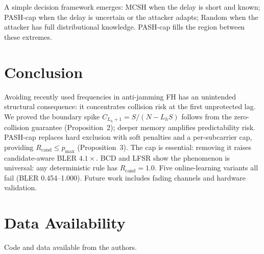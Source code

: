 \documentclass[letterpaper,journal,10pt]{IEEEtran}
\begin{document}
A simple decision framework emerges: MCSH when the delay is short and
known; PASH-cap when the delay is uncertain or the attacker adapts; Random
when the attacker has full distributional knowledge. PASH-cap fills the
region between these extremes.

\balance
\section{Conclusion}
Avoiding recently used frequencies in anti-jamming FH has an unintended
structural consequence: it concentrates collision risk at the first
unprotected lag. We proved the boundary spike $C_{L_h+1}=S/(N-L_hS)$
follows from the zero-collision guarantee (Proposition~2); deeper memory
amplifies predictability risk. PASH-cap replaces hard exclusion with soft
penalties and a per-subcarrier cap, providing $R_{\mathrm{cand}}{\leq}p_{\max}$
(Proposition~3). The cap is essential: removing it raises candidate-aware
BLER $4.1\times$. BCD and LFSR show the phenomenon is universal: any
deterministic rule has $R_{\mathrm{cand}}{=}1.0$. Five online-learning
variants all fail (BLER 0.454--1.000). Future work includes fading channels
and hardware validation.

\section*{Data Availability}
Code and data available from the authors.



\end{document}
